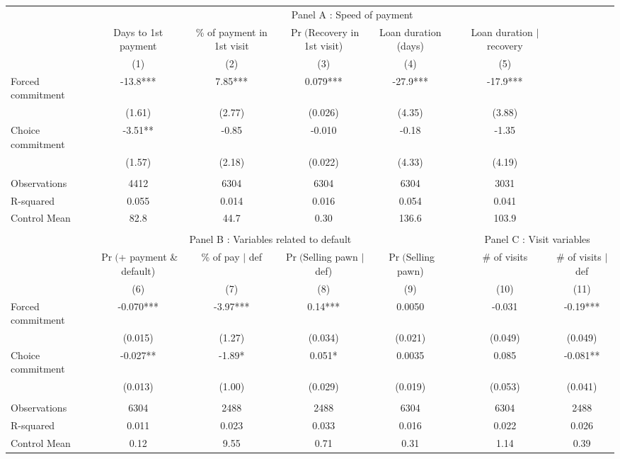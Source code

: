 \begin{tabular}{lccccccc}
\toprule
      & \multicolumn{7}{c}{Panel A  : Speed of payment} \\
\cmidrule{2-8}      & Days to 1st payment & \% of payment in 1st visit & $\Pr($Recovery in 1st visit) & Loan duration (days) &       & Loan duration $|$ recovery &  \\
\cmidrule{1-5}\cmidrule{7-8}      & (1)   & (2)   & (3)   & (4)   &       & (5)   &  \\
\cmidrule{1-5}\cmidrule{7-8}Forced commitment & -13.8*** & 7.85*** & 0.079*** & -27.9*** &       & -17.9*** &  \\
      & (1.61) & (2.77) & (0.026) & (4.35) &       & (3.88) &  \\
Choice commitment & -3.51** & -0.85 & -0.010 & -0.18 &       & -1.35 &  \\
      & (1.57) & (2.18) & (0.022) & (4.33) &       & (4.19) &  \\
      &       &       &       &       &       &       &  \\
\cmidrule{1-5}\cmidrule{7-8}Observations & 4412  & 6304  & 6304  & 6304  &       & 3031  &  \\
R-squared & 0.055 & 0.014 & 0.016 & 0.054 &       & 0.041 &  \\
Control Mean & 82.8  & 44.7  & 0.30  & 136.6 &       & 103.9 &  \\
      &       &       &       &       &       &       &  \\
\midrule
      & \multicolumn{4}{c}{Panel B  : Variables related to default} &       & \multicolumn{2}{c}{Panel C  : Visit variables} \\
\cmidrule{2-8}      & $\Pr($+ payment \& default) & \% of pay $|$ def  & $\Pr($Selling pawn $|$ def) & $\Pr($Selling pawn) &       & \# of visits & \# of visits $|$ def \\
\midrule
\midrule
      & (6)   & (7)   & (8)   & (9)   &       & (10)  & (11) \\
\midrule
\midrule
Forced commitment & -0.070*** & -3.97*** & 0.14*** & 0.0050 &       & -0.031 & -0.19*** \\
      & (0.015) & (1.27) & (0.034) & (0.021) &       & (0.049) & (0.049) \\
Choice commitment & -0.027** & -1.89* & 0.051* & 0.0035 &       & 0.085 & -0.081** \\
      & (0.013) & (1.00) & (0.029) & (0.019) &       & (0.053) & (0.041) \\
      &       &       &       &       &       &       &  \\
\cmidrule{1-5}\cmidrule{7-8}Observations & 6304  & 2488  & 2488  & 6304  &       & 6304  & 2488 \\
R-squared & 0.011 & 0.023 & 0.033 & 0.016 &       & 0.022 & 0.026 \\
Control Mean & 0.12  & 9.55  & 0.71  & 0.31  &       & 1.14  & 0.39 \\
\bottomrule
\bottomrule
\end{tabular}%
